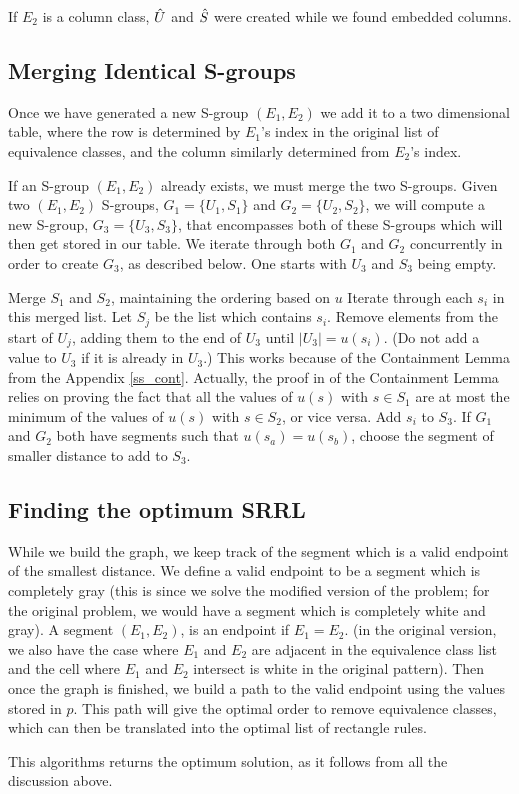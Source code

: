 If $E_2$ is a column class, $\hat{U}$ and $\hat{S}$
 were created while we found embedded columns.



\subsection{Merging Identical S-groups}

Once we have generated a new S-group $(E_1,E_2)$ we add it to a two dimensional table, where the row is determined by $E_1$'s index in the original list of equivalence classes, and the column similarly determined from $E_2$'s index.

If an S-group $(E_1,E_2)$ already exists, we must merge the two S-groups.
Given two $(E_1, E_2)$ S-groups, $G_1 = \{U_1,S_1\}$ and $G_2 = \{U_2,S_2\}$, we will compute a new S-group, $G_3 = \{U_3,S_3\}$, that encompasses both of these S-groups which will then get stored in our table.
We iterate through both $G_1$ and $G_2$ concurrently in order to create $G_3$,
as described below. One starts with $U_3$ and $S_3$ being empty.


Merge $S_1$ and $S_2$, maintaining the ordering based on $u$
Iterate through each $s_i$ in this merged list.
Let $S_j$ be the list which contains $s_i$.
Remove elements from the start of $U_j$,
adding them to the end of $U_3$ until $|U_3| = u(s_i)$.
(Do not add a value to $U_3$ if it is already in $U_3$.)
This works because of the Containment Lemma from the
 Appendix \ref{ss_cont}. Actually, the proof in \cite{ACJKLW07}
of the Containment Lemma relies on proving the fact that
 all the values of $u(s)$ with $s \in S_1$ are at most the minimum
of the values of $u(s)$ with $s \in S_2$, or vice versa.
Add $s_i$ to $S_3$.
If $G_1$ and $G_2$ both have segments such that $u(s_a) = u(s_b)$, choose the segment of smaller distance to add to $S_3$.

\subsection{Finding the optimum SRRL}

While we build the graph, we keep track of the segment which is a valid endpoint of the smallest distance.
We define a valid endpoint to be a segment which is completely gray
(this is since we solve the modified version of the problem;
for the original problem, we would have a segment which is completely
white and gray).
A segment $(E_1,E_2)$, is an endpoint if $E_1=E_2$.
(in the original version, we also have the case where
$E_1$ and $E_2$ are adjacent in the equivalence class list and
 the cell where $E_1$ and $E_2$ intersect is white in the original pattern).
Then once the graph is finished, we build a path to the valid endpoint using the values stored in $p$.
This path will give the optimal order to remove equivalence classes, which can then be translated into the optimal list of rectangle rules.

This algorithms returns the optimum solution, as it follows from all the
discussion above.
